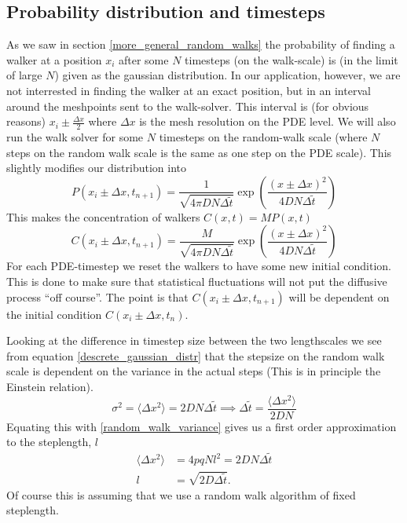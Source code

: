 \subsection{Probability distribution and timesteps}\label{probability_distribution_and_timesteps}
As we saw in section \ref{more_general_random_walks} the probability of finding a walker at a position $x_i$ after some $N$ timesteps (on the walk-scale) is (in the limit of large $N$) given as the gaussian distribution. 
In our application, however, we are not interrested in finding the walker at an exact position, but in an interval around the meshpoints sent to the walk-solver. 
This interval is (for obvious reasons) $x_i\pm\frac{\Delta x}{2}$ where $\Delta x$ is the mesh resolution on the PDE level. 
We will also run the walk solver for some $N$ timesteps on the random-walk scale (where $N$ steps on the random walk scale is the same as one step on the PDE scale). 
This slightly modifies our distribution into
\begin{equation}
 P(x_i\pm\Delta x,t_{n+1}) = \frac{1}{\sqrt{4\pi DN\Delta \tilde{t}}}\exp\left(\frac{(x\pm\Delta x)^2}{4DN\Delta \tilde{t}}\right)
\end{equation}
This makes the concentration of walkers $C(x,t) = MP(x,t)$
\begin{equation}
 C(x_i\pm\Delta x,t_{n+1}) = \frac{M}{\sqrt{4\pi DN\Delta \tilde{t}}}\exp\left(\frac{(x\pm\Delta x)^2}{4DN\Delta \tilde{t}}\right)
\end{equation}
For each PDE-timestep we reset the walkers to have some new initial condition. 
This is done to make sure that statistical fluctuations will not put the diffusive process ``off course''. 
The point is that $ C(x_i\pm\Delta x,t_{n+1})$ will be dependent on the initial condition $ C(x_i\pm\Delta x,t_{n})$.


Looking at the difference in timestep size between the two lengthscales we see from equation \ref{descrete_gaussian_distr} that the stepsize on the random walk scale is dependent on the variance in the actual steps (This is in principle the Einstein relation). 
\begin{equation}
 \sigma^2 = \langle\Delta x^2\rangle = 2DN\Delta\tilde{t} \implies \Delta\tilde{t} = \frac{\langle\Delta x^2\rangle}{2DN}
\end{equation}
Equating this with \ref{random_walk_variance} gives us a first order approximation to the steplength, $l$
\begin{align}
 \langle\Delta x^2\rangle &= 4pqNl^2 = 2DN\Delta\tilde{t} \nonumber \\ 
 l &= \sqrt{2D\Delta\tilde{t}}. \label{steplength}
\end{align}
Of course this is assuming that we use a random walk algorithm of fixed steplength.